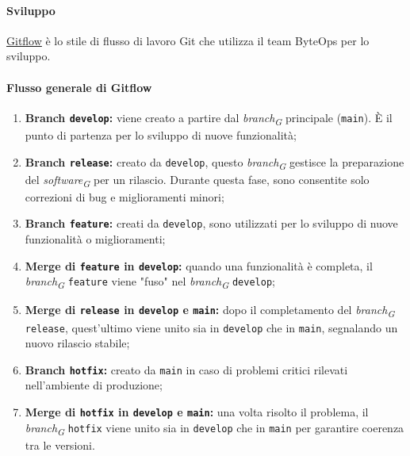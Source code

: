 \paragraph{Sviluppo}
\href{https://www.atlassian.com/it/git/tutorials/comparing-workflows/gitflow-workflow}{Gitflow} è lo stile di flusso di lavoro Git che utilizza il team ByteOps per lo sviluppo.

\paragraph*{Flusso generale di Gitflow}

\begin{enumerate}
    \item \textbf{Branch \texttt{develop}:} viene creato a partire dal \textit{branch}\textsubscript{\textit{G}} principale (\texttt{main}). È il punto di partenza per lo sviluppo di nuove funzionalità;

    \item \textbf{Branch \texttt{release}:} creato da \texttt{develop}, questo \textit{branch}\textsubscript{\textit{G}} gestisce la preparazione del \textit{software}\textsubscript{\textit{G}} per un rilascio. Durante questa fase, sono consentite solo correzioni di bug e miglioramenti minori;

    \item \textbf{Branch \texttt{feature}:} creati da \texttt{develop}, sono utilizzati per lo sviluppo di nuove funzionalità o miglioramenti; 

    \item \textbf{Merge di \texttt{feature} in \texttt{develop}:} quando una funzionalità è completa, il \textit{branch}\textsubscript{\textit{G}} \texttt{feature} viene "fuso" nel \textit{branch}\textsubscript{\textit{G}} \texttt{develop};

    \item \textbf{Merge di \texttt{release} in \texttt{develop} e \texttt{main}:} dopo il completamento del \textit{branch}\textsubscript{\textit{G}} \texttt{release}, quest'ultimo viene unito sia in \texttt{develop} che in \texttt{main}, segnalando un nuovo rilascio stabile;

    \item \textbf{Branch \texttt{hotfix}:} creato da \texttt{main} in caso di problemi critici rilevati nell'ambiente di produzione;

    \item \textbf{Merge di \texttt{hotfix} in \texttt{develop} e \texttt{main}:} una volta risolto il problema, il \textit{branch}\textsubscript{\textit{G}} \texttt{hotfix} viene unito sia in \texttt{develop} che in \texttt{main} per garantire coerenza tra le versioni.
\end{enumerate}

